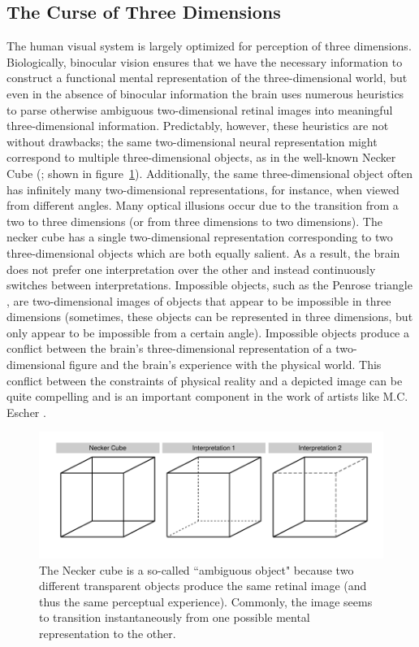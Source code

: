 \documentclass[11pt]{isuthesis}\usepackage[]{graphicx}\usepackage[]{color}
\begin{document}
\subsection{The Curse of Three Dimensions}
The human visual system is largely optimized for perception of three dimensions. Biologically, binocular vision ensures that we have the necessary information to construct a functional mental representation of the three-dimensional world, but even in the absence of binocular information the brain uses numerous heuristics to parse otherwise ambiguous two-dimensional retinal images into meaningful three-dimensional information. Predictably, however, these heuristics are not without drawbacks; the same two-dimensional neural representation might correspond to multiple three-dimensional objects, as in the well-known Necker Cube (\citet{gregory1968perceptual}; shown in figure~\ref{fig:Necker}). Additionally, the same three-dimensional object often has infinitely many two-dimensional representations, for instance, when viewed from different angles. 
Many optical illusions occur due to the transition from a two to three dimensions (or from three dimensions to two dimensions)\citep{gregory1968perceptual}. The necker cube has a single two-dimensional representation corresponding to two three-dimensional objects which are both equally salient. As a result, the brain does not prefer one interpretation over the other and instead continuously switches between interpretations.
Impossible objects, such as the Penrose triangle \citep{penrose1958impossible}, are two-dimensional images of objects that appear to be impossible in three dimensions (sometimes, these objects can be represented in three dimensions, but only appear to be impossible from a certain angle). Impossible objects produce a conflict between the brain's three-dimensional representation of a two-dimensional figure and the brain's experience with the physical world. This conflict between the constraints of physical reality and a depicted image can be quite compelling and is an important component in the work of artists like M.C. Escher \citep{Escher}.

\begin{figure}[htbp]\centering
\includegraphics[keepaspectratio=TRUE,width=.8\linewidth, trim=0in .25in 0in 0in]{fig-neckercube}
\caption[Necker cube]{The Necker cube is a so-called ``ambiguous object" because two different transparent objects  produce the same retinal image (and thus the same perceptual experience). Commonly, the image seems to transition instantaneously from one possible mental representation to the other.}\label{fig:Necker} 
\end{figure}
\end{document}
